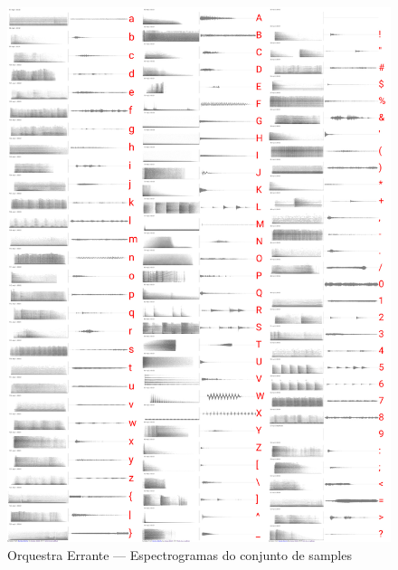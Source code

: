 \begin{figure}
    \caption{\label{samplesorquestra}Orquestra Errante --- Espectrogramas do conjunto de samples}
    \begin{center}
        \includegraphics[width=1\linewidth]{pictures/cap3/bandaorquestra.jpg}
    \end{center}
\end{figure}

\newpage
